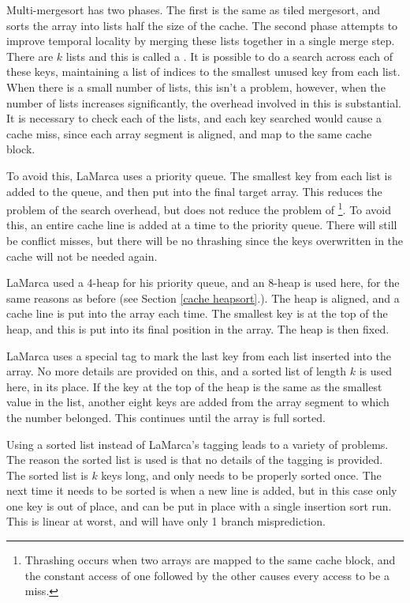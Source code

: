 Multi-mergesort has two phases. The first is the same as tiled mergesort, and
sorts the array into lists half the size of the cache. The second phase attempts
to improve temporal locality by merging these lists together in a single merge
step. There are $k$ lists and this is called a . It is possible
to do a search across each of these keys, maintaining a list of indices to the
smallest unused key from each list. When there is a small number of lists, this
isn't a problem, however, when the number of lists increases significantly, the
overhead involved in this is substantial. It is necessary to check each of the
lists, and each key searched would cause a cache miss, since each array segment
is aligned, and map to the same cache block.

To avoid this, LaMarca uses a priority queue. The smallest key from each list is
added to the queue, and then put into the final target array. This reduces the
problem of the search overhead, but does not reduce the problem of
\footnote{Thrashing occurs when two arrays are mapped to the same
cache block, and the constant access of one followed by the other causes every
access to be a miss.}.  To avoid this, an entire cache line is added at a time
to the priority queue. There will still be conflict misses, but there will be no
thrashing since the keys overwritten in the cache will not be needed again.

LaMarca used a 4-heap for his priority queue, and an 8-heap is used here, for
the same reasons as before (see Section \ref{cache heapsort}.). The heap is
aligned, and a cache line is put into the array each time. The smallest key is
at the top of the heap, and this is put into its final position in the array.
The heap is then fixed.

LaMarca uses a special tag to mark the last key from each list inserted into
the array. No more details are provided on this, and a sorted list of length $k$
is used here, in its place.  If the key at the top of the heap is the same as
the smallest value in the list, another eight keys are added from the array
segment to which the number belonged. This continues until the array is full
sorted.

Using a sorted list instead of LaMarca's tagging leads to a variety of problems.
The reason the sorted list is used is that no details of the tagging is
provided. The sorted list is $k$ keys long, and only needs to be properly sorted
once. The next time it needs to be sorted is when a new line is added, but in
this case only one key is out of place, and can be put in place with a single
insertion sort run. This is linear at worst, and will have only 1 branch
misprediction.

